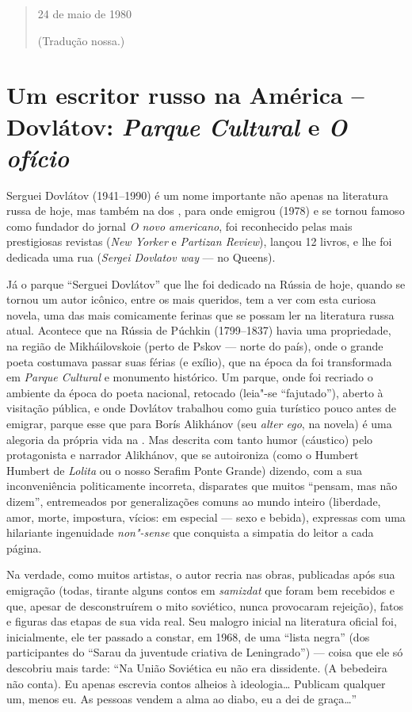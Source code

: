 {\begin{verse}
24 de maio de 1980

(Tradução nossa.)

\end{verse}



\chapter*{Um escritor russo na América -- Dovlátov: \emph{Parque Cultural} e \emph{O ofício}}


Serguei Dovlátov (1941--1990) é um nome importante não apenas na
literatura russa de hoje, mas também na dos , para onde emigrou (1978) e se tornou famoso como fundador do jornal \emph{O novo
americano}, foi reconhecido pelas mais prestigiosas revistas (\emph{New
Yorker} e \emph{Partizan Review}), lançou 12 livros, e lhe foi dedicada
uma rua (\emph{Sergei Dovlatov way} --- no Queens).

Já o parque ``Serguei Dovlátov'' que lhe foi dedicado na Rússia de
hoje, quando se tornou um autor icônico, entre os mais queridos, tem a
ver com esta curiosa novela, uma das mais comicamente ferinas que se
possam ler na literatura russa atual. Acontece que na Rússia de Púchkin
(1799--1837) havia uma propriedade, na região de Mikháilovskoie (perto de
Pskov --- norte do país), onde o grande poeta costumava passar suas
férias (e exílio), que na época da  foi transformada em
\emph{Parque Cultural} e monumento histórico. Um parque, onde foi
recriado o ambiente da época do poeta nacional, retocado (leia"-se
``fajutado''), aberto à visitação pública, e onde Dovlátov trabalhou
como guia turístico pouco antes de emigrar, parque esse que para Borís
Alikhánov (seu \emph{alter ego}, na novela) é uma alegoria da própria
vida na . Mas descrita com tanto humor (cáustico) pelo protagonista
e narrador Alikhánov, que se autoironiza (como o Humbert Humbert de
\emph{Lolita} ou o nosso Serafim Ponte Grande) dizendo, com a sua
inconveniência politicamente incorreta, disparates que muitos ``pensam,
mas não dizem'', entremeados por generalizações comuns ao mundo inteiro
(liberdade, amor, morte, impostura, vícios: em especial --- sexo e
bebida), expressas com uma hilariante ingenuidade \emph{non"-sense} que
conquista a simpatia do leitor a cada página.

Na verdade, como muitos artistas, o autor recria nas obras, publicadas
após sua emigração (todas, tirante alguns contos em \emph{samizdat} que
foram bem recebidos e que, apesar de desconstruírem o mito soviético,
nunca provocaram rejeição), fatos e figuras das etapas de sua vida
real. Seu malogro inicial na literatura oficial foi, inicialmente, ele
ter passado a constar, em 1968, de uma ``lista negra'' (dos
participantes do ``Sarau da juventude criativa de Leningrado'') --- coisa
que ele só descobriu mais tarde: ``Na União Soviética eu não era
dissidente. (A bebedeira não conta). Eu apenas escrevia contos alheios à
ideologia\ldots{} Publicam qualquer um, menos eu. As pessoas vendem a alma ao
diabo, eu a dei de graça\ldots{}''

}
